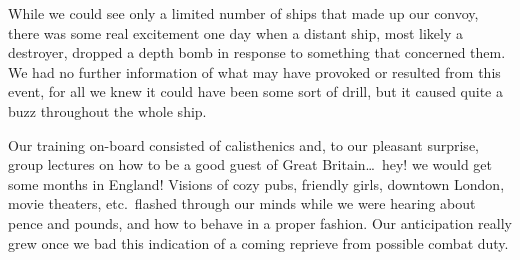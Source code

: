 \documentclass[../m3y]{subfiles}
\begin{document}
While we could see only a limited number of ships that made up our convoy, there was some real excitement one day when a distant ship, most likely a destroyer, dropped a depth bomb in response to something that concerned them. We had no further information of what may have provoked or resulted from this event, for all we knew it could have been some sort of drill, but it caused quite a buzz throughout the whole ship.

Our training on-board consisted of calisthenics and, to our pleasant surprise, group lectures on how to be a good guest of Great Britain\ldots\ hey! we would get some months in England! Visions of cozy pubs, friendly girls, downtown London, movie theaters, etc.\ flashed through our minds while we were hearing about pence and pounds, and how to behave in a proper fashion. Our anticipation really grew once we bad this indication of a coming reprieve from possible combat duty.
\end{document}
